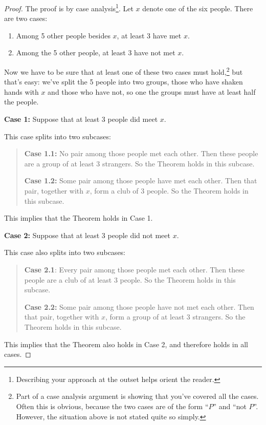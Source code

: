 \begin{proof}
The proof is by case analysis\footnote{Describing your approach at the
outset helps orient the reader.}.  Let $x$ denote one of the six
people.  There are two cases:

\begin{enumerate}
\item\label{3met} Among 5 other people besides $x$, at least 3 have met
  $x$.

\item \label{3notmet} Among the 5 other people, at least 3 have not met
  $x$.
\end{enumerate}

Now we have to be sure that at least one of these two cases must
hold,\footnote{Part of a case analysis argument is showing that you've
  covered all the cases.  Often this is obvious, because the two cases are
  of the form ``$P$'' and ``not $P$''.  However, the situation above is
  not stated quite so simply.} but that's easy: we've split the 5 people
into two groups, those who have shaken hands with $x$ and those who have
not, so one the groups must have at least half the people.

\iffalse
Namely, let $m$ be the number of the 5 other people that have met $x$; so
$5-m$ of these people have not met $x$.  Now possibility is that $m \geq
3$, in which case~\ref{3met} holds.  The other possibility is that $m <
3$, so $5-m > 5-3$, which implies that $5-m \ge 3$, which means
case~\ref{3notmet} holds.  So at least one of the cases~\ref{3met}
and~\ref{3notmet} must hold.
\fi

\textbf{Case 1:}  Suppose that at least 3 people did meet $x$.

This case splits into two subcases:
\begin{quote}

\textbf{Case 1.1:} No pair among those people met each other.  Then these
people are a group of at least 3 strangers.  So the Theorem holds in this
subcase.

\textbf{Case 1.2:} Some pair among those people have met each other.
Then that pair, together with $x$, form a club of 3 people.  So the
Theorem holds in this subcase.

\end{quote}
This implies that the Theorem holds in Case 1.

\textbf{Case 2:} Suppose that at least 3 people did not meet $x$.

This case also splits into two subcases:
\begin{quote}

\textbf{Case 2.1}: Every pair among those people met each other.  Then these
people are a club of at least 3 people.   So the Theorem holds in this subcase.

\textbf{Case 2.2:} Some pair among those people have not met each other.
Then that pair, together with $x$, form a group of at least 3 strangers.
So the Theorem holds in this subcase.

\end{quote}
This implies that the Theorem also holds in Case 2, and therefore holds in
all cases.
\end{proof}

